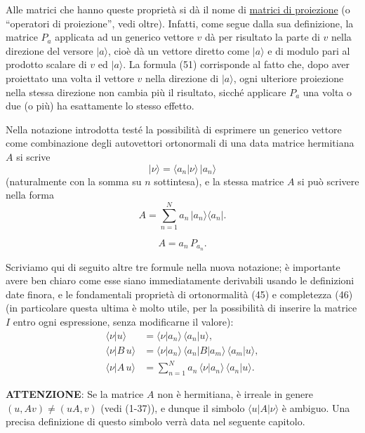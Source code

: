 \documentclass[11pt, a4paper]{book}
\numberwithin{equation}{section}
\begin{document}
Alle matrici che hanno queste proprietà si dà il nome di \uline{matrici
di proiezione} (o ``operatori di proiezione'', vedi oltre). Infatti, come
segue dalla sua definizione, la matrice $P_a$ applicata ad un generico
vettore $v$ dà per risultato la parte di $v$ nella direzione del versore
$|a\rangle$, cioè dà un vettore diretto come $|a\rangle$ e di modulo pari
al prodotto scalare di $v$ ed $|a\rangle$. La formula (51) corrisponde al
fatto che, dopo aver proiettato una volta il vettore $v$ nella direzione di
$|a\rangle$, ogni ulteriore proiezione nella stessa direzione non cambia più
il risultato, sicché applicare $P_a$ una volta o due (o più) ha esattamente
lo stesso effetto.

Nella notazione introdotta testé la possibilità di esprimere un generico
vettore come combinazione degli autovettori ortonormali di una data matrice
hermitiana $A$ si scrive
\begin{equation}
|\nu\rangle = \langle a_n|\nu\rangle\,|a_n\rangle
\end{equation}
(naturalmente con la somma su $n$ sottintesa), e la stessa matrice $A$ si
può scrivere nella forma
\begin{equation}
A = \sum_{n=1}^{N} a_n\,|a_n\rangle\langle a_n|. \tag{53a}
\end{equation}


\begin{equation}
A = a_n\,P_{a_n}. \tag{53b}
\end{equation}

Scriviamo qui di seguito altre tre formule nella nuova notazione; è
importante avere ben chiaro come esse siano immediatamente derivabili
usando le definizioni date finora, e le fondamentali proprietà di
ortonormalità (45) e completezza (46) (in particolare questa ultima è molto
utile, per la possibilità di inserire la matrice $I$ entro ogni
espressione, senza modificarne il valore):
\begin{align*}
\langle \nu | u \rangle
  &= \langle \nu | a_n \rangle\,\langle a_n | u \rangle, \\
\langle \nu | B\, u \rangle
  &= \langle \nu | a_n \rangle\,\langle a_n | B | a_m \rangle\,
     \langle a_m | u \rangle, \\
\langle \nu | A\, u \rangle
  &= \sum_{n=1}^{N} a_n\,\langle \nu | a_n \rangle\,\langle a_n | u \rangle.
\end{align*}

\textbf{ATTENZIONE}: Se la matrice $A$ non è hermitiana, è irreale in
genere $(u, Av) \neq (uA, v)$ (vedi (1-37)), e dunque il simbolo
$\langle u | A | \nu \rangle$ è ambiguo. Una precisa definizione di questo
simbolo verrà data nel seguente capitolo.
\end{document}
